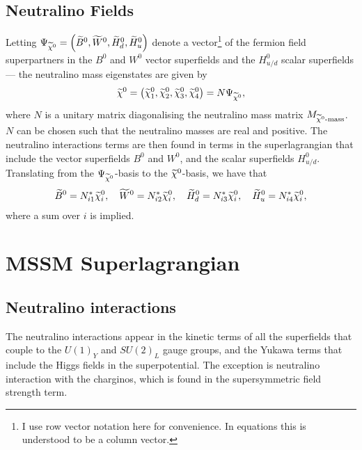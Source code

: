 \documentclass[english, notitlepage]{article}
\begin{document}
    \subsection{Neutralino Fields}
        Letting $\Psi_{\nino} = \pclosed{\bino, \wino, \hinod, \hinou}$ denote a
        vector\footnote{I use row vector notation here for convenience. In equations
            this is understood to be a column vector.} of the fermion field superpartners
        in the $B^0$ and $W^0$ vector superfields and the $H^0_{u/d}$ scalar superfields --- the
        neutralino mass eigenstates are given by
        \begin{align}
            \nino = \pclosed{\nino[1], \nino[2], \nino[3], \nino[4]} = N \Psi_{\nino},
        \end{align}
        where $N$ is a unitary matrix diagonalising the neutralino mass matrix $M_{\nino\text{-mass}}$. \(N\) can be chosen such that the neutralino masses are real and positive.
        The neutralino interactions terms are then found in terms in the superlagrangian that include the vector superfields $B^0$ and $W^0$, and the scalar superfields $H^0_{u/d}$. Translating from the $\Psi_{\nino}$-basis to the $\nino$-basis, we have that
        \begin{align}
            \bino = N_{i1}^* \nino[i],\quad \wino = N_{i2}^* \nino[i],\quad \hinod = N_{i3}^* \nino[i],\quad \hinou = N_{i4}^* \nino[i],
        \end{align}
        where a sum over $i$ is implied.

\section{MSSM Superlagrangian}

    \subsection{Neutralino interactions}
        The neutralino interactions appear in the kinetic terms of all the superfields
        that couple to the $U(1)_Y$ and $SU(2)_L$ gauge groups, and the Yukawa terms
        that include the Higgs fields in the superpotential. The exception is neutralino interaction with the charginos, which is found in the supersymmetric field strength term.
\end{document}
